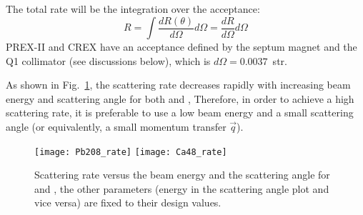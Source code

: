 The total rate will be the integration over the acceptance:
\begin{equation}
    R = \int \frac{dR(\theta)}{d\Omega} d\Omega = \frac{dR}{d\Omega} d\Omega
\end{equation}
PREX-II and CREX have an acceptance defined by the septum magnet and the Q1 collimator 
(see discussions below), which is $d\Omega = 0.0037$~str.

\begin{comment}
Finally, we should also consider the radiative correction due to emission of virtual
and real soft photons (Bremsstrahlung radiation), and hard photons by vacuum polarization,
this correction is formulated as:
\begin{equation}
    \eta = \left(\frac{\Delta}{E} \right)^{bt}
\end{equation}
which is evaluated to be: $\eta \sim 0.5$.
\end{comment}

As shown in Fig.~\ref{fig:scattering_rate}, the scattering rate decreases 
rapidly with increasing beam energy and scattering angle for both \Pb and \Ca, 
Therefore, in order to achieve a high scattering rate, it is preferable to use 
a low beam energy and a small scattering angle (or equivalently, a small momentum transfer $\vec{q}$).
\begin{figure}[!h]
    \texttt{[image: Pb208\_rate]}
    \texttt{[image: Ca48\_rate]}
    \caption[Scattering rate]
    {Scattering rate versus the beam energy and the scattering angle for \Pb and \Ca,
    the other parameters (energy in the scattering angle plot and vice versa) 
    are fixed to their design values.}
    \label{fig:scattering_rate}
\end{figure}

